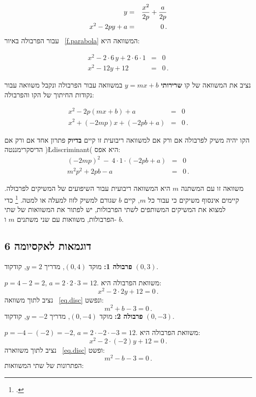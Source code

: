 \begin{eqnarray*}
y&=&\displaystyle\frac{x^2}{2p}+\displaystyle\frac{a}{2p}\\
x^2-2py+a&=&0\,.
\end{eqnarray*}
עבור הפרבולה באיור~%
\ref{f.parabola}
המשוואה היא:

\begin{eqnarray*}
x^2-2\cdot 6\,y + 2\cdot 6 \cdot 1&=&0\\
x^2-12y +12&=&0\,.
\end{eqnarray*}


נציב את המשוואה של קו 
\textbf{שרירותי}
$y=mx+b$
במשוואה עבור הפרבולה ונקבל משוואה עבור נקודות החיתוך של הקו והפרבולה:

\begin{eqnarray*}
x^2-2p(mx+b)+a&=&0\\
x^2+(-2mp)x+(-2pb+a)&=&0\,.
\end{eqnarray*}



הקו יהיה משיק לפרבולה אם ורק אם למשוואה ריבועית זו קיים 
\textbf{בדיוק}
פתרון אחד אם ורק אם הדיסקרימננטה 
)\L{discriminant}(
היא אפס:
\begin{eqnarray}
(-2mp)^2\:-\:4\cdot 1\cdot (-2pb+a)&=&0\\
m^2p^2+2pb-a&=&0\,.\label{eq.disc}
\end{eqnarray}



משוואה זו עם המשתנה 
$m$ 
היא המשוואה ריבועית עבור השיפועים של המשיקים לפרבולה. קיימים אינסוף משיקים כי עבור כל 
$m$,
קיים
$b$
שגורם למשיק לזוז למעלה או למטה.%
\footnote{.}
כדי למצוא את המשיקים המשותפים לשתי הפרבולות, יש לפתור את המשוואות של שתי הפרבולות, משוואות עם שני משתנים
$m$
ו-%
$b$.




\subsection{דוגמאות לאקסיומה 6}

\textbf{פרבולה 1:}
מוקד
$(0,4)$,
מדריך
$y=2$,
קודקוד
$(0,3)$.


$p=4-2=2$, $a=2\cdot 2\cdot 3=12$.
משוואת הפרבולה היא:
\[
x^2-2\cdot 2y +12=0\,.
\]
נציב לתוך משוואה%
~\ref{eq.disc}
ונפשט:
\[
m^2+b-3=0\,.
\]
\textbf{פרבולה 2:}
מוקד
$(0,-4)$,
מדריך
$y=-2$,
קודקוד
$(0,-3)$.

$p=-4-(-2)=-2$, $a=2\cdot -2\cdot -3=12$.
משוואת הפרבולה היא:
\[
x^2-2\cdot (-2)y+12=0\,.
\]
נציב לתוך משווארה%
~\ref{eq.disc}
ופשט:
\[
m^2-b-3=0\,.
\]
הפתרונות של שתי המשוואות:

